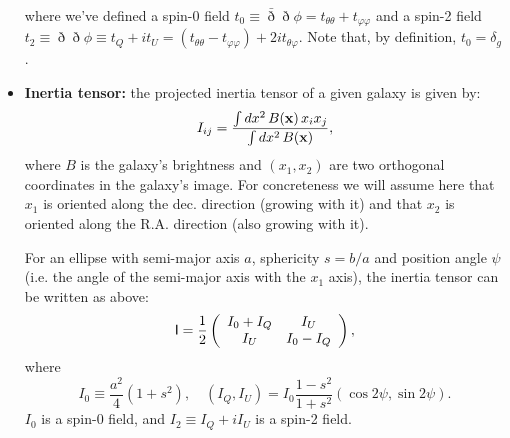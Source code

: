 \documentclass{article}
\begin{document}
\begin{itemize}
    where we've defined a spin-0 field $t_0\equiv\bar{\eth}\eth\phi=t_{\theta\theta}+t_{\varphi\varphi}$ and a spin-2 field $t_2\equiv\eth\eth\phi\equiv t_Q+it_U=(t_{\theta\theta}-t_{\varphi\varphi})+2it_{\theta\varphi}$. Note that, by definition, $t_0=\delta_g$.
    \item {\bf Inertia tensor:} the projected inertia tensor of a given galaxy is given by:
    \begin{equation}
      I_{ij}=\frac{\int dx^2\,B({\bf x})\,x_ix_j}{\int dx^2\,B({\bf x})},
    \end{equation}
    where $B$ is the galaxy's brightness and $(x_1,x_2)$ are two orthogonal coordinates in the galaxy's image. For concreteness we will assume here that $x_1$ is oriented along the dec. direction (growing with it) and that $x_2$ is oriented along the R.A. direction (also growing with it).
    
    For an ellipse with semi-major axis $a$, sphericity $s=b/a$ and position angle $\psi$ (i.e. the angle of the semi-major axis with the $x_1$ axis), the inertia tensor can be written as above:
    \begin{equation}
      {\sf I}=\frac{1}{2}\left(
      \begin{array}{cc}
        I_0+I_Q & I_U \\
        I_U & I_0-I_Q
      \end{array}
      \right),
    \end{equation}
    where
    \begin{equation}
      I_0\equiv\frac{a^2}{4}(1+s^2),\hspace{12pt}(I_Q,I_U)=I_0\frac{1-s^2}{1+s^2}\left(\cos2\psi,\sin2\psi\right).
    \end{equation}
    $I_0$ is a spin-0 field, and $I_2\equiv I_Q+iI_U$ is a spin-2 field.
    

\end{itemize}
\end{document}
